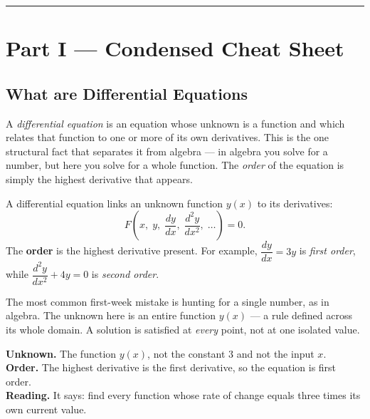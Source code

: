 \vspace{0.6em}
\hrule
\vspace{0.6em}

{}
\section*{Part I --- Condensed Cheat Sheet}
\setcounter{section}{0}   %

\subsection{What are Differential Equations}

A \emph{differential equation} is an equation whose unknown is a function and
which relates that function to one or more of its own derivatives. This is the
one structural fact that separates it from algebra --- in algebra you solve for
a number, but here you solve for a whole function. The \emph{order} of the
equation is simply the highest derivative that appears.

\begin{formulabox}
A differential equation links an unknown function $y(x)$ to its derivatives:
\[
    F\!\left(x,\; y,\; \frac{dy}{dx},\; \frac{d^{2}y}{dx^{2}},\; \dots\right) = 0.
\]
The \textbf{order} is the highest derivative present. For example,
$\dfrac{dy}{dx} = 3y$ is \emph{first order}, while $\dfrac{d^{2}y}{dx^{2}} + 4y = 0$
is \emph{second order}.
\end{formulabox}

\begin{warningbox}
The most common first-week mistake is hunting for a single number, as in
algebra. The unknown here is an entire function $y(x)$ --- a rule defined across
its whole domain. A solution is satisfied at \emph{every} point, not at one
isolated value.
\end{warningbox}

\begin{examplebox}[Worked Example 0.1: Read $\frac{dy}{dx} = 3y$]
\textbf{Unknown.} The function $y(x)$, not the constant $3$ and not the input $x$.\\
\textbf{Order.} The highest derivative is the first derivative, so the equation
is first order.\\
\textbf{Reading.} It says: find every function whose rate of change equals three
times its own current value.
\end{examplebox}

